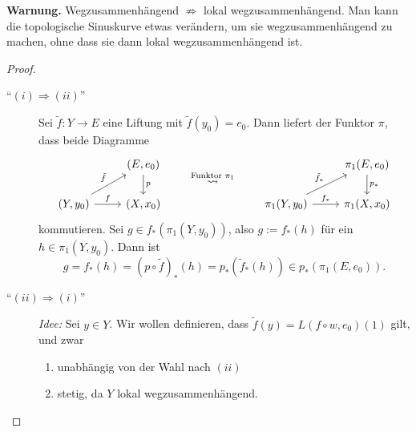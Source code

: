 \documentclass[language=ngerman]{TemplateLecture} %
\begin{document}
\textbf{Warnung.} Wegzusammenhängend $\not\Rightarrow$ lokal wegzusammenhängend. Man kann die topologische Sinuskurve etwas verändern, um sie wegzusammenhängend zu machen, ohne dass sie dann lokal wegzusammenhängend ist.



\begin{proof}
    \begin{description}
        \item[\enquote{$(i) \Rightarrow (ii)$}] Sei $\tilde{f}: Y \to E$ eine Liftung mit $\tilde{f}(y_0) = e_0$. Dann liefert der Funktor $\pi$, dass beide Diagramme 
        \begin{equation*}
            \begin{tikzcd}
                & (E,e_0) \arrow[d, "p"] \\
                (Y,y_0) \arrow[ur, "\tilde{f}"] \arrow[r, "f"] & (X,x_0)
            \end{tikzcd} \quad \quad \overset{\text{Funktor $\pi_1$}}{\leadsto} \quad \quad \begin{tikzcd}
                & \pi_1(E,e_0) \arrow[d, "p_*"] \\
                \pi_1(Y,y_0) \arrow[ur, "\tilde{f}_*"] \arrow[r, "f_*"] & \pi_1(X,x_0)
            \end{tikzcd}
        \end{equation*}
        kommutieren. Sei $g \in f_*(\pi_1(Y,y_0))$, also $g := f_*(h)$ für ein $h \in \pi_1(Y,y_0)$. Dann ist 
        \begin{equation*}
            g = f_*(h) = (p \circ \tilde{f})_*(h) = p_*(\tilde{f}_*(h)) \in p_*(\pi_1(E, e_0)).
        \end{equation*}
        \item[\enquote{$(ii) \Rightarrow (i)$}] \emph{Idee:} Sei $y \in Y$. Wir wollen definieren, dass $\tilde{f}(y) = L(f \circ w, e_0)(1)$ gilt, und zwar
        \begin{enumerate}
            \item unabhängig von der Wahl nach $(ii)$
            \item stetig, da $Y$ lokal wegzusammenhängend.
        \end{enumerate}

\end{description}
\end{proof}
\end{document}
